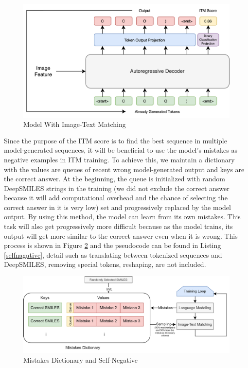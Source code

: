 \documentclass[12pt]{article}
\begin{document}
\begin{figure}
    \centering
    \includegraphics[width=0.8\linewidth]{itm.drawio.png}
    \caption{Model With Image-Text Matching}
    \label{fig:itm}
\end{figure}
Since the purpose of the ITM score is to find the best sequence in multiple model-generated sequences, it will be beneficial to use the model's mistakes as negative examples in ITM training. To achieve this, we maintain a dictionary with the values are queues of recent wrong model-generated output and keys are the correct answer. At the beginning, the queue is initialized with random DeepSMILES strings in the training (we did not exclude the correct answer because it will add computational overhead and the chance of selecting the correct answer in it is very low) set and progressively replaced by the model output. By using this method, the model can learn from its own mistakes. This task will also get progressively more difficult because as the model trains, its output will get more similar to the correct answer even when it is wrong. This process is shown in Figure \ref{fig:selfnegative} and the pseudocode can be found in Listing \ref{selfnagative}, detail such as translating between tokenized sequences and DeepSMILES, removing special tokens, reshaping, are not included.   
\begin{figure}
    \centering
    \includegraphics[width=0.8\linewidth]{selfnegative.drawio.png}
    \caption{Mistakes Dictionary and Self-Negative}
    \label{fig:selfnegative}
\end{figure}
\end{document}
